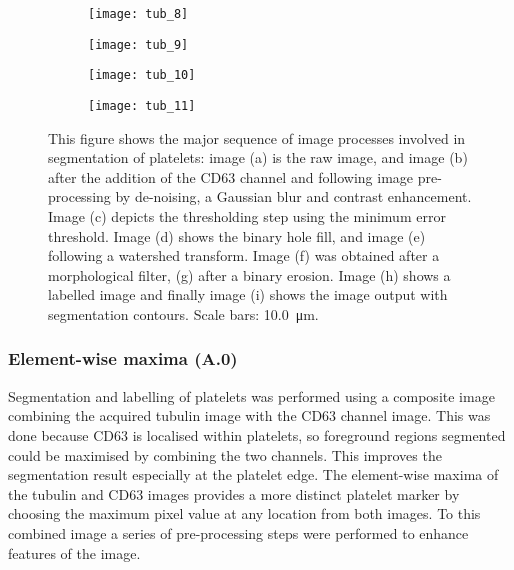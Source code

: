 \begin{figure}[htbp]
	\begin{subfigure}[b]{0.32\linewidth}
		\centering
		\texttt{[image: tub\_8]}
		\caption{}
		\label{figure:image_processing:platelet:tub_8}
		\vspace{1ex}
	\end{subfigure}
	\begin{subfigure}[b]{0.32\linewidth}
		\centering
		\texttt{[image: tub\_9]}
		\caption{}
		\label{figure:image_processing:platelet:tub_9}
		\vspace{1ex}
	\end{subfigure}
	\begin{subfigure}[b]{0.32\linewidth}
		\centering
		\texttt{[image: tub\_10]}
		\caption{}
		\label{figure:image_processing:platelet:tub_10}
		\vspace{1ex}
	\end{subfigure}
	\begin{subfigure}[b]{0.32\linewidth}
		\texttt{[image: tub\_11]}
		\caption{}
		\label{figure:image_processing:platelet:tub_11}
		\vspace{1ex}
	\end{subfigure}
\caption[Image processing for platelet segmentation]{This figure shows the  major sequence of image processes involved in segmentation of platelets: image (a) is the raw image, and image (b) after the addition of the CD63 channel and following image pre-processing by de-noising, a Gaussian blur and contrast enhancement. Image (c) depicts the thresholding step using the minimum error threshold. Image (d) shows the binary hole fill, and image (e) following a watershed transform. Image (f) was obtained after a morphological filter, (g) after a binary erosion. Image (h) shows a labelled image and finally image (i) shows the image output with segmentation contours. Scale bars: \SI{10.0}{\micro\meter}.}
\label{figure:image_processing:platelets}
\end{figure}

\subsubsection{Element-wise maxima (A.0)}
Segmentation and labelling of platelets was performed using a composite image combining the acquired tubulin image with the CD63 channel image. This was done because CD63 is localised within platelets, so foreground regions segmented could be maximised by combining the two channels. This improves the segmentation result especially at the platelet edge. The element-wise maxima of the tubulin and CD63 images provides a more distinct platelet marker by choosing the maximum pixel value at any location from both images. To this combined image a series of pre-processing steps were performed to enhance features of the image.

